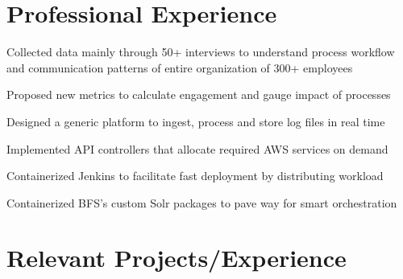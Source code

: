 \documentclass[]{deedy-resume-openfont}
\begin{document}
\hfill
\begin{minipage}[t]{0.66\textwidth} 


\section{Professional Experience}

\vspace{\topsep} %
\begin{tightemize}
\item Collected data mainly through 50+ interviews to understand process workflow and communication patterns of entire organization of 300+ employees
\item Proposed new metrics to calculate engagement and gauge impact of processes
\end{tightemize}
\sectionsep

\begin{tightemize}
\item Designed a generic platform to ingest, process and store log files in real time
\item Implemented API controllers that allocate required AWS services on demand
\end{tightemize}
\sectionsep

\begin{tightemize}
\item Containerized Jenkins to facilitate fast deployment by distributing workload
\item Containerized BFS’s custom Solr packages to pave way for smart orchestration
\end{tightemize}
\sectionsep


\section{Relevant Projects/Experience}


\end{minipage}
\end{document}
